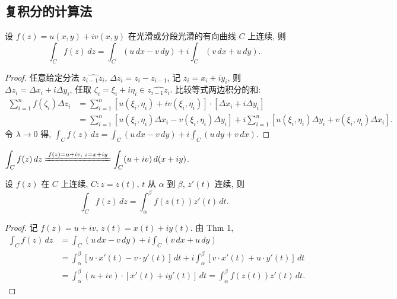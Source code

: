 \documentclass[theorem=false,mathfont=none,openany,sub3section]{easybook}
\begin{document}
\subsection{复积分的计算法}

\begin{theorem}
  设 $f(z)=u(x,y)+iv(x,y)$ 在光滑或分段光滑的有向曲线 $C$ 上连续, 则
  \[
  \int_{C}f(z)\,dz=\int_{C}(u\,dx-v\,dy)+i\int_{C}(v\,dx+u\,dy).
  \]
\end{theorem}

\begin{proof}
  任意给定分法 $\widehat{z_{i-1}z_{i}}$, $\Delta z_{i}=z_{i}-z_{i-1}$, 记 $z_{i}=x_{i}+iy_{i}$, 则 $\Delta z_{i}=\Delta x_{i}+i\Delta y_{i}$, 任取 $\zeta_{i}=\xi_{i}+i\eta_{i}\in\widehat{z_{i-1}z_{i}}$.
  比较等式两边积分的和:
  \[
  \begin{aligned}
  \sum_{i=1}^{n}f(\zeta_{i})\Delta z_{i}
  &=\sum_{i=1}^{n}[u(\xi_{i},\eta_{i})+iv(\xi_{i},\eta_{i})]\cdot[\Delta x_{i}+i\Delta y_{i}]\\
  &=\sum_{i=1}^{n}[u(\xi_{i},\eta_{i})\Delta x_{i}-v(\xi_{i},\eta_{i})\Delta y_{i}]
    +i\sum_{i=1}^{n}[u(\xi_{i},\eta_{i})\Delta y_{i}+v(\xi_{i},\eta_{i})\Delta x_{i}].
  \end{aligned}
  \]
  令 $\lambda\to0$ 得, $\int_{C}f(z)\,dz=\int_{C}(u\,dx-v\,dy)+i\int_{C}(u\,dy+v\,dx)$.
\end{proof}

\begin{remark}
  $\displaystyle\int_{C}f(z)\,dz\xlongequal{f(z)=u+iv,\;z=x+iy}\int_{C}(u+iv)\,d(x+iy)$.
\end{remark}

\begin{theorem}
  设 $f(z)$ 在 $C$ 上连续, $C:z=z(t)$, $t$ 从 $\alpha$ 到 $\beta$, $z'(t)$ 连续, 则
  \[
  \int_{C}f(z)\,dz=\int_{\alpha}^{\beta}f(z(t))z'(t)\,dt.
  \]
\end{theorem}

\begin{proof}
  记 $f(z)=u+iv$, $z(t)=x(t)+iy(t)$. 由 Thm 1,
  \begin{align*}
  \int_{C}f(z)\,dz
  &=\int_{C}(u\,dx-v\,dy)+i\int_{C}(v\,dx+u\,dy)\\
  &=\int_{\alpha}^{\beta}[u\cdot x'(t)-v\cdot y'(t)]\,dt
    +i\int_{\alpha}^{\beta}[v\cdot x'(t)+u\cdot y'(t)]\,dt\\
  &=\int_{\alpha}^{\beta}(u+iv)\cdot[x'(t)+iy'(t)]\,dt
    =\int_{\alpha}^{\beta}f(z(t))z'(t)\,dt.
  \end{align*}
\end{proof}
\end{document}
